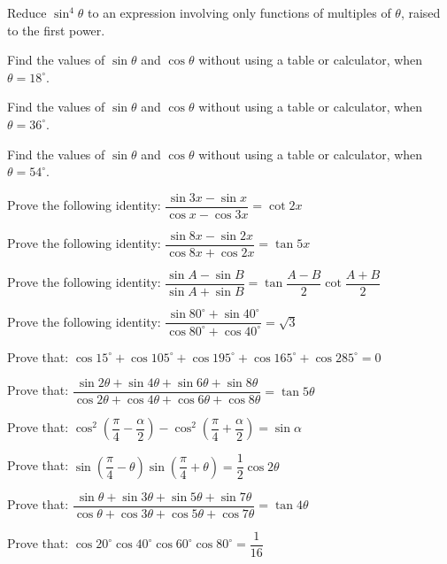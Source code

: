 \documentclass[11pt,a4paper]{article}
\begin{document}
\begin{longlist}
\item Reduce $\sin^4\theta$ to an expression involving only functions of multiples of $\theta$, raised to the first power.

\item Find the values of $\sin\theta$ and $\cos\theta$ without using a table or calculator, when $\theta=18^\circ$.

\item Find the values of $\sin\theta$ and $\cos\theta$ without using a table or calculator, when $\theta=36^\circ$.

\item Find the values of $\sin\theta$ and $\cos\theta$ without using a table or calculator, when $\theta=54^\circ$.

\item Prove the following identity: $\dfrac{\sin3x-\sin x}{\cos x-\cos3x}=\cot2x$

\item Prove the following identity: $\dfrac{\sin8x-\sin2x}{\cos8x+\cos2x}=\tan5x$

\item Prove the following identity: $\dfrac{\sin A-\sin B}{\sin A+\sin B}=\tan\dfrac{A-B}{2}\cot\dfrac{A+B}{2}$

\item Prove the following identity: $\dfrac{\sin80^\circ+\sin40^\circ}{\cos80^\circ+\cos40^\circ}=\sqrt{3}$

\item Prove that: $\cos15^\circ+\cos105^\circ+\cos195^\circ+\cos165^\circ+\cos285^\circ=0$

\item Prove that: $\dfrac{\sin2\theta+\sin4\theta+\sin6\theta+\sin8\theta}{\cos2\theta+\cos4\theta+\cos6\theta+\cos8\theta}=\tan5\theta$

\item Prove that: $\cos^2\left(\dfrac{\pi}{4}-\dfrac{\alpha}{2}\right)-\cos^2\left(\dfrac{\pi}{4}+\dfrac{\alpha}{2}\right)=\sin\alpha$

\item Prove that: $\sin\left(\dfrac{\pi}{4}-\theta\right)\sin\left(\dfrac{\pi}{4}+\theta\right)=\dfrac{1}{2}\cos2\theta$

\item Prove that: $\dfrac{\sin\theta+\sin3\theta+\sin5\theta+\sin7\theta}{\cos\theta+\cos3\theta+\cos5\theta+\cos7\theta}=\tan4\theta$

\item Prove that: $\cos20^\circ\cos40^\circ\cos60^\circ\cos80^\circ=\dfrac{1}{16}$


\end{longlist}
\end{document}
